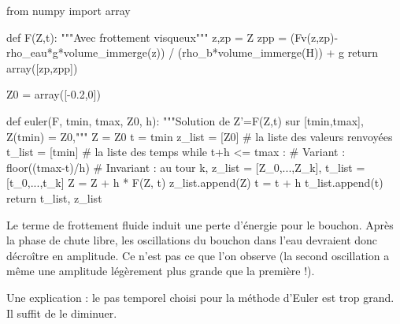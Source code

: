 \begin{pyverbatim}
from numpy import array

def F(Z,t):
    """Avec frottement visqueux"""
    z,zp = Z
    zpp = (Fv(z,zp)- rho_eau*g*volume_immerge(z)) / (rho_b*volume_immerge(H)) + g
    return array([zp,zpp])
    
Z0 = array([-0.2,0])
\end{pyverbatim}

\question{} 

\begin{pyverbatim}
def euler(F, tmin, tmax, Z0, h):
    """Solution de Z'=F(Z,t) sur [tmin,tmax], Z(tmin) = Z0,"""
    Z = Z0
    t = tmin
    z_list = [Z0] # la liste des valeurs renvoyées
    t_list = [tmin] # la liste des temps
    while t+h <= tmax : 
        # Variant : floor((tmax-t)/h)
        # Invariant : au tour k, z_list = [Z_0,...,Z_k], t_list = [t_0,...,t_k]
        Z = Z + h * F(Z, t)
        z_list.append(Z)
        t = t + h
        t_list.append(t)
    return t_list, z_list
\end{pyverbatim}

\question{} 
Le terme de frottement fluide induit une perte d'énergie pour le bouchon. Après la phase de chute libre, les oscillations du bouchon dans l'eau devraient donc décroître en amplitude.
Ce n'est pas ce que l'on observe (la second oscillation a même une amplitude légèrement plus grande que la première !).

Une explication : le pas temporel choisi pour la méthode d'Euler est trop grand. Il suffit de le diminuer.

